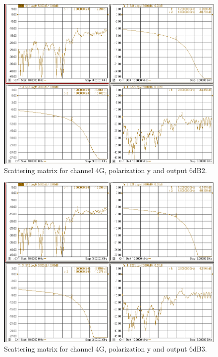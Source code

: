\documentclass[12pt,a4paper,oneside]{article}
\begin{document}
\begin{figure}[H]
\centering
\includegraphics[width=0.9\linewidth]{VNA_results/4Gy_6dB2.png}
\caption{Scattering matrix for channel 4G, polarization y and output 6dB2.}
\label{fig:4Gy_6dB2}
\end{figure}


\begin{figure}[H]
\centering
\includegraphics[width=0.9\linewidth]{VNA_results/4Gy_6dB3.png}
\caption{Scattering matrix for channel 4G, polarization y and output 6dB3.}
\label{fig:4Gy_6dB3}
\end{figure}
\end{document}
